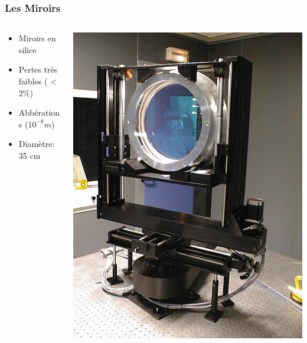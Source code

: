 \documentclass{beamer}
\begin{document}
\begin{frame}
	\frametitle{Les Miroirs}
	\begin{columns}
	
		\begin{column}{0.5\textwidth}
			\begin{itemize}
				\item Miroirs en silice
				\item Pertes très faibles ( < 2\%)
				\item Abbérations ($10^{-8} m$)
				\item Diamètre: 35 cm
			\end{itemize}
		\end{column}
		
		\begin{column}{0.5\textwidth}
			\includegraphics[width=\textwidth]{Docs/miroir.png}
		\end{column}
	\end{columns}
\end{frame}
\end{document}
